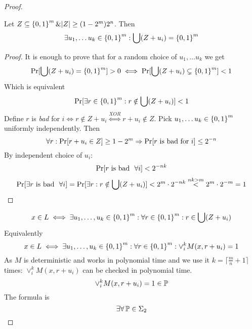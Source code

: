 \begin{proof}
	\begin{lemma}
		Let $Z \subseteq \operatorname{\{ 0, 1 \}}^m \& |Z| \geq (1 - 2^m) 2^n$.
		Then
		\[ \exists u_1, \ldots u_k \in \operatorname{\{ 0, 1 \}}^m: \bigcup (Z + u_i) = \operatorname{\{ 0, 1 \}}^m \]
	\end{lemma}
	\begin{proof}
		It is enough to prove that for a random choice of $u_1, \ldots u_k$ we get
		\[ \operatorname{Pr}[\bigcup (Z + u_i) = \operatorname{\{ 0, 1 \}}^m] > 0 \iff \operatorname{Pr}[\bigcup (Z + u_i) \subsetneq \operatorname{\{ 0, 1 \}}^m] < 1 \]
		Which is equivalent
		\[ \operatorname{Pr}[\exists r \in \operatorname{\{ 0, 1 \}}^m : r \notin \bigcup (Z + u_i)] < 1 \]
	Define $r$ is \emph{bad} for $i \iff r \notin Z + u_i \stackrel{XOR}{\iff} r + u_i \notin Z$.
	Pick $u_1, \ldots u_k \in \operatorname{\{ 0, 1 \}}^m$ uniformly independently.
	Then
	\[ \forall r: \operatorname{Pr}[r + u_i \in Z] \geq 1 - 2^m \Rightarrow \operatorname{Pr}[r \ \text{is bad for}\ i] \leq  2^{-n} \]
	By independent choice of $u_i$:
	\[ \operatorname{Pr}[r \ \text{is bad }\ \forall i] < 2^{-nk} \]
	\[ \operatorname{Pr}[\exists r \ \text{is bad }\ \forall i] = \operatorname{Pr}[\exists r: r \notin \bigcup (Z + u_i)] < 2^m \cdot 2^{-nk} \stackrel{nk > m}{<} 2^m \cdot 2^{-m} = 1 \]
	\end{proof}

	\[ x \in L \iff \exists u_1, \ldots, u_k \in \operatorname{\{ 0, 1 \}}^m: \forall r \in \operatorname{\{ 0, 1 \}}^m: r \in \bigcup (Z + u_i) \]
	Equivalently
	\[ x \in L \iff \exists u_1, \ldots, u_k \in \operatorname{\{ 0, 1 \}}^m: \forall r \in \operatorname{\{ 0, 1 \}}^m: \vee_i^k M(x, r + u_i) = 1 \]
	As $M$ is deterministic and works in polynomial time and we use it $k = \lceil \frac{m}{n} + 1 \rceil$ times: $\vee_i^k M(x, r + u_i)$ can be checked in polynomial time.
	\[ \vee_i^k M(x, r + u_i) = 1 \in \operatorname{\mathbb{P}} \]
	The formula is
	\[ \exists \forall \operatorname{\mathbb{P}} \in \Sigma_2 \]


\end{proof}

